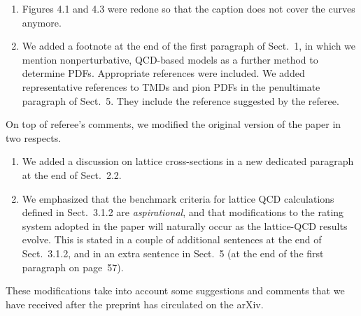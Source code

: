 \documentclass[11pt]{article}
\begin{document}
\begin{enumerate}
\item Figures 4.1 and 4.3 were redone so that the
caption does not cover the curves anymore.

\item We added a footnote at the end of the first paragraph of Sect.~1,
in which we mention nonperturbative, QCD-based models as a 
further method to determine PDFs. Appropriate references were included.
We added representative references to TMDs and pion PDFs in the 
penultimate paragraph of Sect.~5. They include the reference suggested by 
the referee.

\end{enumerate}

On top of referee's comments, we modified the original version
of the paper in two respects. 

\begin{enumerate}

\item We added a discussion on lattice cross-sections in a new dedicated
paragraph at the end of Sect.~2.2.

\item We emphasized that the benchmark criteria for lattice QCD 
calculations defined in Sect.~3.1.2 are {\it aspirational}, and that
modifications to the rating system adopted in the paper will naturally
occur as the lattice-QCD results evolve. This is stated in a couple of 
additional sentences at the end of Sect.~3.1.2, and in an extra sentence 
in Sect.~5 (at the end of the first paragraph on page~57).

\end{enumerate}

These modifications take into account some suggestions and comments that we
have received after the preprint has circulated on the arXiv.
\end{document}
